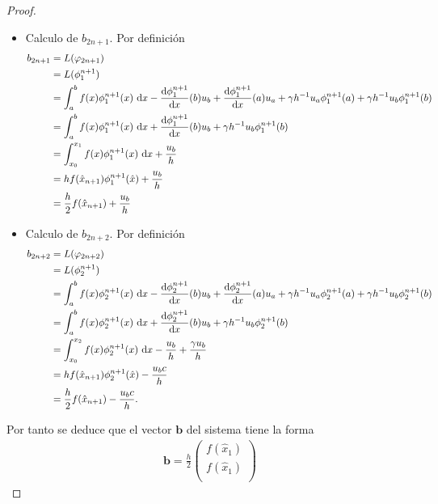 \documentclass[10pt,a4paper]{report}
\newcommand{\dx}{\textup{d}x}
\providecommand{\Dx}[1]{\frac{\textup{d} #1}{\textup{d}x}}
\begin{document}
\begin{proof}
\begin{itemize}
            \item Calculo de $b_{2n+1}$. Por definición
            \begin{align*}
            	b_{2n+1} &= L(\varphi_{2n+1})\\ 
            	&= L(\phi^{n+1}_{1})\\ 
            	&= \int_{a}^{b} f(x)\phi^{n+1}_{1}(x)\ \dx - \Dx{\phi^{n+1}_{1}}(b)u_{b} + \Dx{\phi^{n+1}_{1}}(a)u_{a} + \gamma h^{-1}u_{a}\phi^{n+1}_{1}(a) + \gamma h^{-1}u_{b}\phi^{n+1}_{1}(b)\\
            	&= \int_{a}^{b} f(x)\phi^{n+1}_{1}(x)\ \dx + \Dx{\phi^{n+1}_{1}}(b)u_{b} + \gamma h^{-1}u_{b}\phi^{n+1}_{1}(b)\\
            	&= \int_{x_{0}}^{x_{1}} f(x)\phi^{n+1}_{1}(x)\ \dx +\frac{u_{b}}{h}\\
            	&= hf(\hat{x}_{n+1})\phi^{n+1}_{1}(\hat{x})+ \frac{u_{b}}{h}\\
            	&= \frac{h}{2}f(\hat{x}_{n+1}) + \frac{u_{b}}{h}
            \end{align*}
            \item Calculo de $b_{2n+2}$. Por definición
            \begin{align*}
            	b_{2n+2} &= L(\varphi_{2n+2})\\ 
            	&= L(\phi^{n+1}_{2})\\ 
            	&= \int_{a}^{b} f(x)\phi^{n+1}_{2}(x)\ \dx - \Dx{\phi^{n+1}_{2}}(b)u_{b} + \Dx{\phi^{n+1}_{2}}(a)u_{a} + \gamma h^{-1}u_{a}\phi^{n+1}_{2}(a) + \gamma h^{-1}u_{b}\phi^{n+1}_{2}(b)\\
            	&= \int_{a}^{b} f(x)\phi^{n+1}_{2}(x)\ \dx + \Dx{\phi^{n+1}_{2}}(b)u_{b} + \gamma h^{-1}u_{b}\phi^{n+1}_{2}(b)\\
            	&= \int_{x_{0}}^{x_{2}} f(x)\phi^{n+1}_{2}(x)\ \dx -\frac{u_{b}}{h} + \frac{\gamma u_{b}}{h}\\
            	&= hf(\hat{x}_{n+1})\phi^{n+1}_{2}(\hat{x})- \frac{u_{b}c}{h}\\
            	&= \frac{h}{2}f(\hat{x}_{n+1}) - \frac{u_{b}c}{h}.
            \end{align*}
    \end{itemize}
    Por tanto se deduce que el vector $\textbf{b}$ del sistema tiene la forma
    \begin{align*}
    	\textbf{b} = \frac{h}{2}\begin{pmatrix}
    		f(\hat{x}_{1})\\ 
    		f(\hat{x}_{1})\\ 

\end{pmatrix}
\end{align*}
\end{proof}
\end{document}
